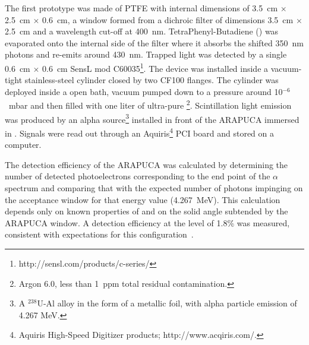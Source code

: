 The first prototype was made of PTFE  with internal dimensions of \SI{3.5}{cm} $\times$ \SI{2.5}{cm} $\times$ \SI{0.6}{cm}, a window formed from a dichroic filter of  dimensions \SI{3.5}{cm} $\times$ \SI{2.5}{cm} and a wavelength cut-off at \SI{400}{nm}. 
TetraPhenyl-Butadiene () was evaporated onto the internal side of the filter where it absorbs the shifted \SI{350}{nm} photons and re-emits around \SI{430}{nm}. Trapped light was detected by a single \SI{0.6}{cm} $\times$ \SI{0.6}{cm} SensL  mod C60035\footnote{http://sensl.com/products/c-series/}.
The device was installed inside a vacuum-tight stainless-steel cylinder closed by two CF100 flanges. The cylinder was deployed inside a \lar open bath, vacuum pumped down to a pressure around  10$^{-6}$~\si{mbar} and then filled with one liter of ultra-pure \lar\footnote{Argon 6.0, less than \SI{1}{ppm} total residual contamination.}. 
Scintillation light emission was produced by an alpha source\footnote{A $^{238}$U-Al alloy in the form of a metallic foil, with alpha particle emission of 4.267 MeV.} installed in front of the ARAPUCA immersed in \lar. Signals were read out through an Aquiris\footnote{Aquiris High-Speed Digitizer products; http://www.acqiris.com/.} PCI board and stored on a computer.


The detection efficiency of the ARAPUCA was calculated by determining the number of detected photoelectrons corresponding to the end point of the $\alpha$ spectrum and comparing that with the expected number of photons impinging on the acceptance window for that %
energy value (\SI{4.267}{MeV}).  This calculation depends only on known properties of \lar and on the solid angle subtended by the ARAPUCA window. A detection efficiency at the level of 1.8\%  was measured, consistent with  expectations for this configuration~\cite{Marinho:2018doi}.


